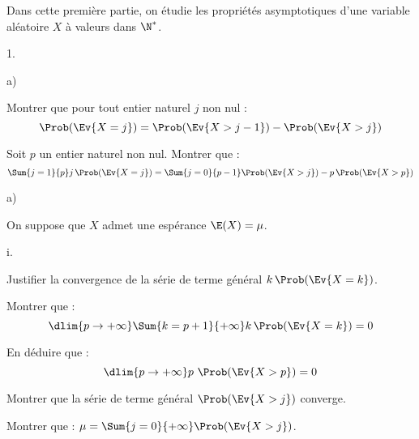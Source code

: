 \documentclass[11pt]{article}%
\begin{document}
\noindent
Dans cette première partie, on étudie les propriétés asymptotiques
d'une variable aléatoire $X$ à valeurs dans $\N^*$.
\begin{noliste}{1.}
  \setlength{\itemsep}{2mm}
\item 
  \begin{noliste}{a)}
  \item Montrer que pour tout entier naturel $j$ non nul : 
    \[
    \Prob(\Ev{X=j}) = \Prob(\Ev{X > j-1}) - \Prob(\Ev{X>j})
    \]
    
    



    
  \item Soit $p$ un entier naturel non nul. Montrer que :
    \[
    \Sum{j=1}{p} j \, \Prob(\Ev{X=j})= \Sum{j=0}{p-1} 
    \Prob(\Ev{X>j})-p \, \Prob(\Ev{X>p})
    \]
    
    
\end{noliste}




\item 
  \begin{noliste}{a)}
  \item On suppose que $X$ admet une espérance $\E(X)= \mu$.
    \begin{nonoliste}{i.}
    \item Justifier la convergence de la série de terme général $k \,
      \Prob(\Ev{X=k})$.
      
      

    \item Montrer que : 
      \[
      \dlim{p \to +\infty} \Sum{k=p+1}{+\infty} k \, \Prob(\Ev{X=k})=0
      \]
      
      




    \item En déduire que :
      \[
      \dlim{p \to +\infty} p \ \Prob(\Ev{X>p}) = 0
      \]

      

    \item Montrer que la série de terme général $\Prob(\Ev{X>j})$
      converge.

      




  \item Montrer que : $\mu= \Sum{j=0}{+\infty} \Prob(\Ev{X >j})$.

      
    \end{nonoliste}
    

\end{noliste}
\end{noliste}
\end{document}

